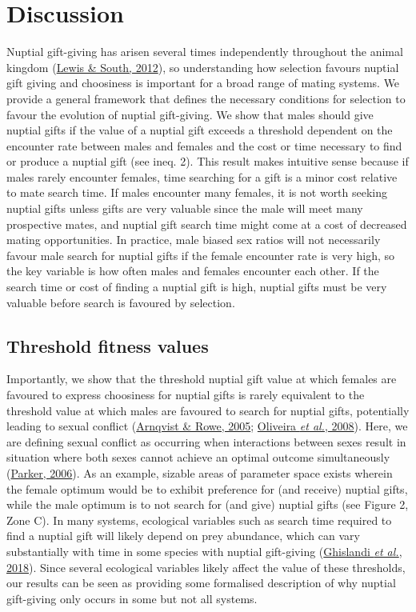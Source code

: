 \documentclass[
]{article}
\begin{document}
\hypertarget{discussion}{%
\section{Discussion}\label{discussion}}

Nuptial gift-giving has arisen several times independently throughout
the animal kingdom (\protect\hyperlink{ref-Lewis2012}{Lewis \& South,
2012}), so understanding how selection favours nuptial gift giving and
choosiness is important for a broad range of mating systems. We provide
a general framework that defines the necessary conditions for selection
to favour the evolution of nuptial gift-giving. We show that males
should give nuptial gifts if the value of a nuptial gift exceeds a
threshold dependent on the encounter rate between males and females and
the cost or time necessary to find or produce a nuptial gift (see ineq.
2). This result makes intuitive sense because if males rarely encounter
females, time searching for a gift is a minor cost relative to mate
search time. If males encounter many females, it is not worth seeking
nuptial gifts unless gifts are very valuable since the male will meet
many prospective mates, and nuptial gift search time might come at a
cost of decreased mating opportunities. In practice, male biased sex
ratios will not necessarily favour male search for nuptial gifts if the
female encounter rate is very high, so the key variable is how often
males and females encounter each other. If the search time or cost of
finding a nuptial gift is high, nuptial gifts must be very valuable
before search is favoured by selection.

\hypertarget{threshold-fitness-values}{%
\subsection{Threshold fitness values}\label{threshold-fitness-values}}

Importantly, we show that the threshold nuptial gift value at which
females are favoured to express choosiness for nuptial gifts is rarely
equivalent to the threshold value at which males are favoured to search
for nuptial gifts, potentially leading to sexual conflict
(\protect\hyperlink{ref-Arnqvist2005a}{Arnqvist \& Rowe, 2005};
\protect\hyperlink{ref-Oliveira2008}{Oliveira \emph{et al.}, 2008}).
Here, we are defining sexual conflict as occurring when interactions
between sexes result in situation where both sexes cannot achieve an
optimal outcome simultaneously
(\protect\hyperlink{ref-Parker2006}{Parker, 2006}). As an example,
sizable areas of parameter space exists wherein the female optimum would
be to exhibit preference for (and receive) nuptial gifts, while the male
optimum is to not search for (and give) nuptial gifts (see Figure 2,
Zone C). In many systems, ecological variables such as search time
required to find a nuptial gift will likely depend on prey abundance,
which can vary substantially with time in some species with nuptial
gift-giving (\protect\hyperlink{ref-Ghislandi2018}{Ghislandi \emph{et
al.}, 2018}). Since several ecological variables likely affect the value
of these thresholds, our results can be seen as providing some
formalised description of why nuptial gift-giving only occurs in some
but not all systems.
\end{document}
